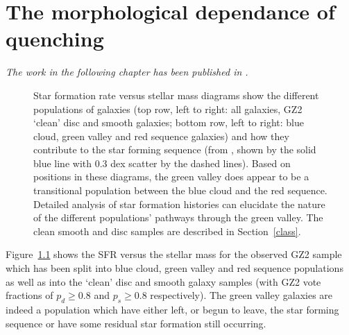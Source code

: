 \chapter{The morphological dependance of quenching}

\emph{The work in the following chapter has been published in \citet{smethurst15}.}

\begin{figure}
\caption[SFR-stellar mass plane split by morphology and colour]{Star formation rate versus stellar mass diagrams show the different populations of galaxies  (top row, left to right: all galaxies, GZ2 `clean' disc and smooth galaxies; bottom row, left to right: blue cloud, green valley and red sequence galaxies) and how they contribute to the star forming sequence (from \citet{peng10}, shown by the solid blue line with 0.3 dex scatter by the dashed lines). Based on positions in these diagrams, the green valley does appear to be a transitional population between the blue cloud and the red sequence. Detailed analysis of star formation histories can elucidate the nature of the different populations' pathways through the green valley. The clean smooth and disc samples are described in Section~\ref{class}.}
\label{sfr_mass_sub}
\end{figure}

Figure~\ref{sfr_mass_sub} shows the SFR versus the stellar mass for the observed GZ2 sample which has been split into blue cloud, green valley and red sequence populations as well as into the `clean' disc and smooth galaxy samples (with GZ2 vote fractions of $p_d \geq 0.8$ and $p_s \geq 0.8$ respectively). The green valley galaxies are indeed a population which have either left, or begun to leave, the star forming sequence or have some residual star formation still occurring. 


